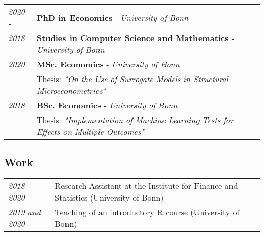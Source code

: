 \documentclass{article}
\begin{document}
\begin{table}[h!]
\renewcommand{\arraystretch}{1.4}
    \begin{tabular}{p{110pt} p{350pt}}
        \textit{2020 - } & \textbf{PhD in Economics} - \textit{University of Bonn}\\
        \textit{2018 - } &  \textbf{Studies in Computer Science and Mathematics} - \textit{University of Bonn}\\
        \textit{2020} &  \textbf{MSc. Economics} - \textit{University of Bonn} \hfill\\
        \hfill &  \vspace*{-15pt} \small Thesis: \textit{"On the Use of Surrogate Models in Structural Microeconometrics"}\\
        \textit{2018} & \textbf{BSc. Economics} - \textit{University of Bonn} \hfill\\
            \hfill &  \vspace*{-15pt} \small Thesis: \textit{"Implementation of Machine Learning Tests for Effects on Multiple Outcomes"}\\
    \end{tabular}
\end{table}


\subsection*{Work}

\begin{table}[h!]
\renewcommand{\arraystretch}{1.4}
    \begin{tabular}{p{110pt} p{350pt}}
         \textit{2018 - 2020} &  Research Assistant at the Institute for Finance and Statistics (University of Bonn) \\
         \textit{2019 and 2020} & Teaching of an introductory \textsf{R} course (University of Bonn) \\
    \end{tabular}
\end{table}


% 
\end{document}
